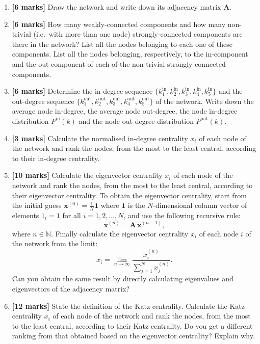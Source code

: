 \documentclass[11pt,a4paper]{article}
\begin{document}
\begin{enumerate}[label=\textbf{(\alph*)}, leftmargin=*, itemsep=1.1em]

\item \textbf{[6 marks]}
Draw the network and write down its adjacency matrix $\mathbf{A}$.

\item \textbf{[6 marks]}
How many weakly-connected components and how many non-trivial (i.e.\ with more than one node) strongly-connected components are there in the network? List all the nodes belonging to each one of these components. List all the nodes belonging, respectively, to the in-component and the out-component of each of the non-trivial strongly-connected components.

\item \textbf{[6 marks]}
Determine the in-degree sequence $\{k_1^{\mathrm{in}}, k_2^{\mathrm{in}}, k_3^{\mathrm{in}}, k_4^{\mathrm{in}}, k_5^{\mathrm{in}}\}$ and the out-degree sequence $\{k_1^{\mathrm{out}}, k_2^{\mathrm{out}}, k_3^{\mathrm{out}}, k_4^{\mathrm{out}}, k_5^{\mathrm{out}}\}$ of the network. Write down the average node in-degree, the average node out-degree, the node in-degree distribution $P^{\mathrm{in}}(k)$ and the node out-degree distribution $P^{\mathrm{out}}(k)$.

\item \textbf{[3 marks]}
Calculate the normalised in-degree centrality $x_i$ of each node of the network and rank the nodes, from the most to the least central, according to their in-degree centrality.

\item \textbf{[10 marks]}
Calculate the eigenvector centrality $x_i$ of each node of the network and rank the nodes, from the most to the least central, according to their eigenvector centrality. To obtain the eigenvector centrality, start from the initial guess $\mathbf{x}^{(0)} = \frac{1}{N}\mathbf{1}$ where $\mathbf{1}$ is the $N$-dimensional column vector of elements $1_i = 1$ for all $i = 1, 2, \ldots, N$, and use the following recursive rule:
\[
  \mathbf{x}^{(n)} = \mathbf{A}\,\mathbf{x}^{(n-1)},
\]
where $n \in \mathbb{N}$. Finally calculate the eigenvector centrality $x_i$ of each node $i$ of the network from the limit:
\[
  x_i = \lim_{n \to \infty} \frac{x_i^{(n)}}{\sum_{j=1}^{N} x_j^{(n)}}.
\]
Can you obtain the same result by directly calculating eigenvalues and eigenvectors of the adjacency matrix?

\item \textbf{[12 marks]}
State the definition of the Katz centrality. Calculate the Katz centrality $x_i$ of each node of the network and rank the nodes, from the most to the least central, according to their Katz centrality. Do you get a different ranking from that obtained based on the eigenvector centrality? Explain why.


\end{enumerate}
\end{document}
